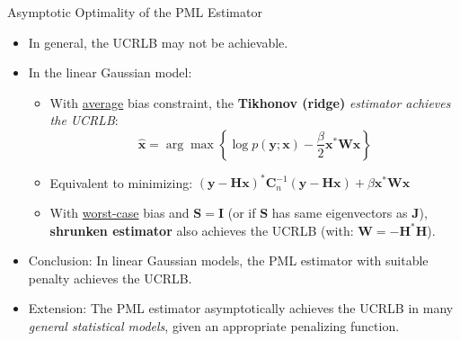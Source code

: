 \documentclass{beamer}
\begin{document}

\begin{frame}{Asymptotic Optimality of the PML Estimator}
\begin{itemize}
    \item In general, the UCRLB may not be achievable.
    \item In the linear Gaussian model:
    \begin{itemize}
        \item With \underline{average} bias constraint, the \textbf{Tikhonov (ridge)} \textit{estimator achieves the UCRLB}:
        \[
        \hat{\mathbf{x}} = \arg\max\left\{\log p(\mathbf{y}; \mathbf{x}) - \frac{\beta}{2} \mathbf{x}^{*} \mathbf{W} \mathbf{x} \right\}
        \]
        \item Equivalent to minimizing: $(\mathbf{y} - \mathbf{H}\mathbf{x})^{*} \mathbf{C}_{n}^{-1} (\mathbf{y} - \mathbf{H}\mathbf{x}) + \beta \mathbf{x}^{*} \mathbf{W} \mathbf{x}$
        \item With \underline{worst-case} bias and \( \mathbf{S} = \mathbf{I} \) (or if $\mathbf{S}$ has same eigenvectors as $\mathbf{J}$), \textbf{shrunken estimator} also achieves the UCRLB (with: $\mathbf{W} = -\mathbf{H}^{*}\mathbf{H}$).
    \end{itemize}
    \item Conclusion: In linear Gaussian models, the PML estimator with suitable penalty achieves the UCRLB.
    \item Extension: The PML estimator asymptotically achieves the UCRLB in many \textit{general statistical models}, given an appropriate penalizing function.
\end{itemize}
\end{frame}
\end{document}
